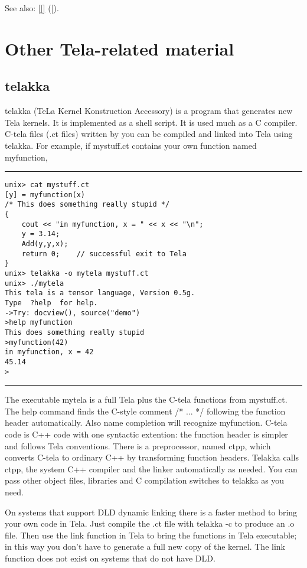 \documentclass[a4paper]{article}
\begin{document}
{{See also: \ref{[} {([)}.


\section{Other Tela-related material}


\subsection{telakka\label{telakka}}



telakka (TeLa Kernel Konstruction Accessory) is a program that
generates new Tela kernels. It is implemented as a shell script. It is
used much as a C compiler. C-tela files (.ct files) written by you can
be compiled and linked into Tela using telakka. For example, if
mystuff.ct contains your own function named myfunction,

\begin{tscreen}
\par
\addvspace{\medskipamount}
\nopagebreak\hrule
\begin{verbatim}
unix> cat mystuff.ct
[y] = myfunction(x)
/* This does something really stupid */
{
    cout << "in myfunction, x = " << x << "\n";
    y = 3.14;
    Add(y,y,x);
    return 0;    // successful exit to Tela
}
unix> telakka -o mytela mystuff.ct
unix> ./mytela
This tela is a tensor language, Version 0.5g.
Type  ?help  for help.
->Try: docview(), source("demo")
>help myfunction
This does something really stupid 
>myfunction(42)
in myfunction, x = 42
45.14
>
\end{verbatim} 
\nopagebreak\hrule 
\addvspace{\medskipamount}
\end{tscreen}


The executable mytela is a full Tela plus the C-tela functions from
mystuff.ct. The help command finds the C-style comment /* ... */
following the function header automatically. Also name completion will
recognize myfunction. C-tela code is C++ code with one syntactic
extention: the function header is simpler and follows Tela
conventions. There is a preprocessor, named ctpp, which converts
C-tela to ordinary C++ by transforming function headers. Telakka calls
ctpp, the system C++ compiler and the linker automatically as
needed. You can pass other object files, libraries and C compilation
switches to telakka as you need.

On systems that support DLD dynamic linking there is a faster method
to bring your own code in Tela. Just compile the .ct file with telakka
-c to produce an .o file. Then use the link function in Tela to bring
the functions in Tela executable; in this way you don't have to
generate a full new copy of the kernel. The link function does not
exist on systems that do not have DLD.




}}
\end{document}
